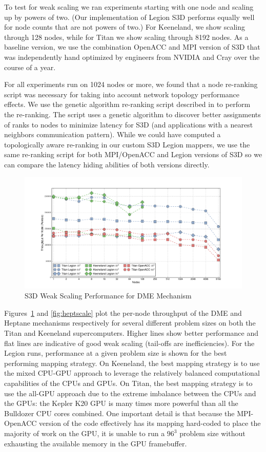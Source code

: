 To test for weak scaling we ran experiments starting 
with one node and scaling up by powers of two. (Our
implementation of Legion S3D performs equally well 
for node counts that are not powers of two.) For
Keeneland, we show scaling through 128 nodes, while
for Titan we show scaling through 8192 nodes. As a
baseline version, we use the combination OpenACC
and MPI version of S3D that was independently 
hand optimized by engineers from NVIDIA and Cray
over the course of a year. 

For all experiments run on 1024 nodes or more, we 
found that a node re-ranking script was necessary 
for taking into account network topology performance 
effects. We use the genetic algorithm re-ranking script 
described in \cite{GAMPI} to perform the re-ranking.
The script uses a genetic algorithm to discover 
better assignments of ranks to nodes to minimize
latency for S3D (and applications with a nearest 
neighbors communication pattern). While we could
have computed a topologically aware re-ranking in our
custom S3D Legion mappers, we use the same re-ranking script
for both MPI/OpenACC and Legion versions of S3D so
we can compare the latency hiding abilities of
both versions directly.

\begin{figure}
\centering
\includegraphics[scale=0.4]{figs/dme_scaling.pdf}
\caption{S3D Weak Scaling Performance for DME Mechanism\label{fig:dmescale}} 
\end{figure}

Figures~\ref{fig:dmescale} and \ref{fig:heptscale} 
plot the per-node throughput of the 
DME and Heptane mechanisms respectively for several 
different problem sizes on both the Titan and Keeneland 
supercomputers. Higher lines show better performance 
and flat lines are indicative of good weak scaling (tail-offs 
are inefficiencies). For the Legion runs, performance at a 
given problem size is shown for the best performing 
mapping strategy. On Keeneland, the best mapping strategy
is to use the mixed CPU-GPU approach to leverage the 
relatively balanced computational capabilities of the 
CPUs and GPUs. On Titan, the best mapping strategy is 
to use the all-GPU approach due to the extreme imbalance 
between the CPUs and the GPUs: the Kepler K20 GPU is many
times more powerful than all the Bulldozer CPU cores combined.
One important detail is that because the MPI-OpenACC
version of the code effectively has its mapping hard-coded
to place the majority of work on the GPU, it is unable
to run a $96^3$ problem size without exhausting the
available memory in the GPU framebuffer.

